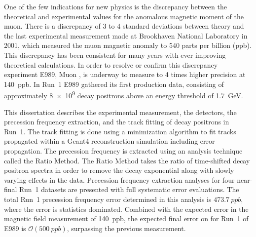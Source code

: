 


One of the few indications for new physics is the discrepancy between the theoretical and experimental values for the anomalous magnetic moment of the muon. There is a discrepancy of 3 to 4 standard deviations between theory and the last experimental measurement made at Brookhaven National Laboratory in 2001, which measured the muon magnetic anomaly \amu to 540 parts per billion (ppb). This discrepancy has been consistent for many years with ever improving theoretical calculations. In order to resolve or confirm this discrepancy experiment E989, Muon \gmtwo, is underway to measure \amu to 4 times higher precision at \SI{140}{ppb}. In Run~1 E989 gathered its first production data, consisting of approximately \SI{8e9}{} decay positrons above an energy threshold of \SI{1.7}{\GeV}.

This dissertation describes the experimental measurement, the detectors, the precession frequency extraction, and the track fitting of decay positrons in Run~1. The track fitting is done using a \chisq minimization algorithm to fit tracks propagated within a Geant4 reconstruction simulation including error propagation. The precession frequency is extracted using an analysis technique called the Ratio Method. The Ratio Method takes the ratio of time-shifted decay positron spectra in order to remove the decay exponential along with slowly varying effects in the data. Precession frequency extraction analyses for four near-final Run~1 datasets are presented with full systematic error evaluations. The total Run~1 precession frequency error determined in this analysis is $\SI{473.7}{ppb}$, where the error is statistics dominated. Combined with the expected error in the magnetic field measurement of \SI{140}{ppb}, the expected final error on \amu for Run~1 of E989 is $\mathcal{O}(\SI{500}{ppb})$, surpassing the previous measurement.






